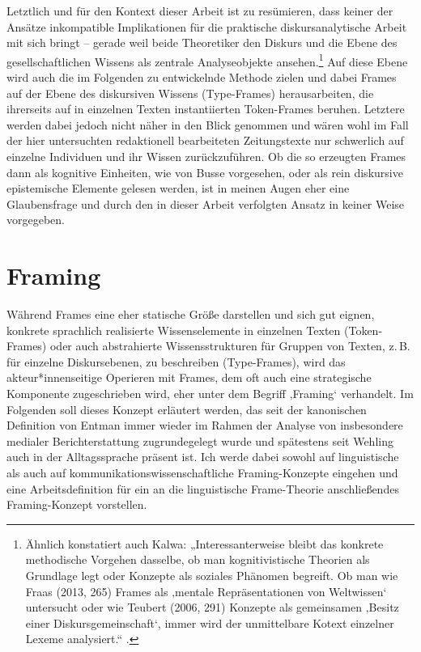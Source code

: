 Letztlich und für den Kontext dieser Arbeit ist zu resümieren, dass keiner der Ansätze inkompatible Implikationen für die praktische diskursanalytische Arbeit mit sich bringt -- gerade weil beide Theoretiker den Diskurs und die Ebene des gesellschaftlichen Wissens als zentrale Analyseobjekte ansehen.\footnote{Ähnlich konstatiert auch Kalwa: „Interessanterweise bleibt das konkrete methodische Vorgehen dasselbe, ob man kognitivistische Theorien als Grundlage legt oder Konzepte als soziales Phänomen begreift. Ob man wie Fraas (2013, 265) Frames als ‚mentale Repräsentationen von Weltwissen` untersucht oder wie Teubert (2006, 291) Konzepte als gemeinsamen ‚Besitz einer Diskursgemeinschaft`, immer wird der unmittelbare Kotext einzelner Lexeme analysiert.`` \autocite*[20]{kalwaKonstitutionKonzeptenDiskursen2019}.} Auf diese Ebene wird auch die im Folgenden zu entwickelnde Methode zielen und dabei Frames auf der Ebene des diskursiven Wissens (Type-Frames) herausarbeiten, die ihrerseits auf in einzelnen Texten instantiierten Token-Frames beruhen. Letztere werden dabei jedoch nicht näher in den Blick genommen und wären wohl im Fall der hier untersuchten redaktionell bearbeiteten Zeitungstexte nur schwerlich auf einzelne Individuen und ihr Wissen zurückzuführen. Ob die so erzeugten Frames dann als kognitive Einheiten, wie von Busse vorgesehen, oder als rein diskursive epistemische Elemente gelesen werden, ist in meinen Augen eher eine Glaubensfrage und durch den in dieser Arbeit verfolgten Ansatz in keiner Weise vorgegeben.

\section{Framing}\label{framing}

Während Frames eine eher statische Größe darstellen und sich gut eignen, konkrete sprachlich realisierte Wissenselemente in einzelnen Texten (Token-Frames) oder auch abstrahierte Wissensstrukturen für Gruppen von Texten, z.\,B. für einzelne Diskursebenen, zu beschreiben (Type-Frames), wird das akteur*innenseitige Operieren mit Frames, dem oft auch eine strategische Komponente zugeschrieben wird, eher unter dem Begriff ‚Framing` verhandelt. Im Folgenden soll dieses Konzept erläutert werden, das seit der kanonischen Definition von Entman \autocite*{entmanFramingClarificationFractured1993} immer wieder im Rahmen der Analyse von insbesondere medialer Berichterstattung zugrundegelegt wurde \autocite[354]{matthesWhatsFrameContent2009} und spätestens seit Wehling \autocite*{wehlingPolitischesFramingWie2016} auch in der Alltagssprache präsent ist. Ich werde dabei sowohl auf linguistische als auch auf kommunikationswissenschaftliche Framing-Konzepte eingehen und eine Arbeitsdefinition für ein an die linguistische Frame-Theorie anschließendes Framing-Konzept vorstellen.


